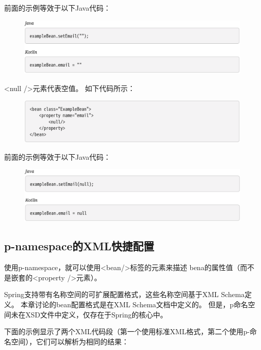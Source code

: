 \newpage
前面的示例等效于以下Java代码：

\begin{figure}[ht]
    \centering
    \includegraphics[width=1\linewidth]{./Figure/IMG_code_47.png}
\end{figure}

<null />元素代表空值。 如下代码所示：

\begin{figure}[ht]
    \centering
    \includegraphics[width=1\linewidth]{./Figure/IMG_code_48.png}
\end{figure}


前面的示例等效于以下Java代码：

\begin{figure}[ht]
    \centering
    \includegraphics[width=1\linewidth]{./Figure/IMG_code_49.png}
\end{figure}

\subsection{p-namespace的XML快捷配置}
使用p-namespace，就可以使用<bean/>标签的元素来描述
bena的属性值（而不是嵌套的<property />元素）。

Spring支持带有名称空间的可扩展配置格式，这些名称空间基于XML Schema定义。 本章讨论的bean配置格式是在XML Schema文档中定义的。 但是，p命名空间未在XSD文件中定义，仅存在于Spring的核心中。

\newpage
下面的示例显示了两个XML代码段（第一个使用标准XML格式，第二个使用p-命名空间），它们可以解析为相同的结果：


